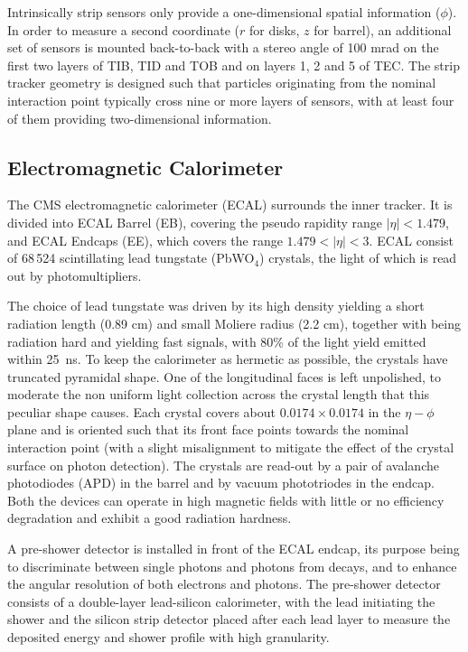 Intrinsically strip sensors only provide a one-dimensional spatial information ($\phi$). In order to measure a second coordinate ($r$ for disks, $z$ for barrel), an additional set of sensors is mounted back-to-back with a stereo angle of 100 mrad on the first two layers of TIB, TID and TOB and on layers 1, 2 and 5 of TEC. The strip tracker geometry is designed such that particles originating from the nominal interaction point typically cross nine or more layers of sensors, with at least four of them providing two-dimensional information.


\subsection{Electromagnetic Calorimeter}

The CMS electromagnetic calorimeter (ECAL) surrounds the inner tracker. It is divided into ECAL Barrel (EB), covering the pseudo rapidity range $|\eta| < 1.479$, and ECAL Endcaps (EE), which covers the range $1.479 < |\eta| < 3$. 
ECAL consist of 68\,524 scintillating lead tungstate (PbWO$_4$) crystals, the light of which is read out by photomultipliers. 

The choice of lead tungstate was driven by its high density yielding a short radiation length (0.89 cm) and small Moliere radius (2.2 cm), together with being radiation hard and yielding fast signals, with 80\% of the light yield emitted within 25~ns. To keep the calorimeter as hermetic as possible, the crystals have truncated pyramidal shape. One of the longitudinal faces is left unpolished, to moderate the non uniform light collection across the crystal length that this peculiar shape causes. Each crystal covers about $0.0174 \times 0.0174$ in the $\eta-\phi$ plane and is oriented such that its front face points towards the nominal interaction point (with a slight misalignment to mitigate the effect of the crystal surface on photon detection). The crystals are read-out by a pair of avalanche photodiodes (APD) in the barrel and by vacuum phototriodes in the endcap. Both the devices can operate in high magnetic fields with little or no efficiency degradation and exhibit a good radiation hardness.

A pre-shower detector is installed in front of the ECAL endcap, its purpose being to discriminate between single photons and photons from \piz decays, and to enhance the angular resolution of both electrons and photons. The pre-shower detector consists of a double-layer lead-silicon calorimeter, with the lead initiating the shower and the silicon strip detector placed after each lead layer to measure the deposited energy and shower profile with high granularity.


